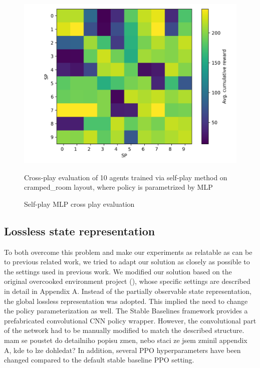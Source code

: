 \begin{figure}[!ht]
    \centering
    \includegraphics*[width=13cm]{../img/MLP_OFF_DIAG_TEST(3).png}
    \caption{Self-play MLP cross play evaluation}
    \label{MLPSPCrossPlay}
    \medskip
    \small 
    Cross-play evaluation of 10 agents trained via self-play method on cramped\_room layout, where policy is parametrized by MLP

\end{figure}

\subsection*{Lossless state representation}
To both overcome this problem and make our experiments as relatable as can be to previous related work, we tried to adapt our solution as closely as possible to the settings used in previous work.
We modified our solution based on the original overcooked environment project (\cite{carroll2020utility}), whose specific settings are described in detail in Appendix A.
Instead of the partially observable state representation, the global lossless representation was adopted.
This implied the need to change the policy parameterization as well.
The Stable Baselines framework provides a prefabricated convolutional CNN policy wrapper.
However, the convolutional part of the network had to be manually modified to match the described structure. {\color{blue} mam se poustet do detailniho popisu zmen, nebo staci ze jsem zminil appendix A, kde to lze dohledat?}
In addition, several PPO hyperparameters have been changed compared to the default stable baseline PPO setting.


